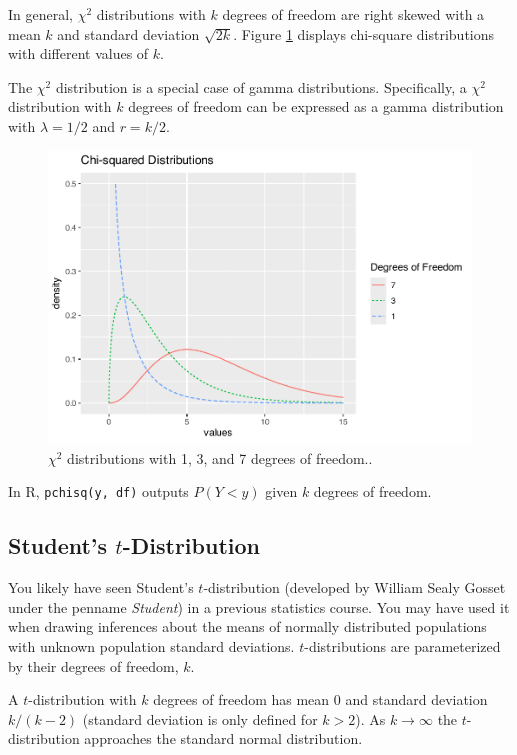 \documentclass[
]{krantz}
\begin{document}
In general, \(\chi^2\) distributions with \(k\) degrees of freedom are right skewed with a mean \(k\) and standard deviation \(\sqrt{2k}\). Figure \ref{fig:multChisq} displays chi-square distributions with different values of \(k\).

The \(\chi^2\) distribution is a special case of gamma distributions. Specifically, a \(\chi^2\) distribution with \(k\) degrees of freedom can be expressed as a gamma distribution with \(\lambda = 1/2\) and \(r = k/2\).



\begin{figure}

{\centering \includegraphics[width=0.6\linewidth]{bookdown-BeyondMLR_files/figure-latex/multChisq-1} 

}

\caption{\(\chi^2\) distributions with 1, 3, and 7 degrees of freedom..}\label{fig:multChisq}
\end{figure}

In R, \texttt{pchisq(y,\ df)} outputs \(P(Y < y)\) given \(k\) degrees of freedom.

\hypertarget{students-t-distribution}{%
\subsection{\texorpdfstring{Student's \(t\)-Distribution}{Student's t-Distribution}}\label{students-t-distribution}}

You likely have seen Student's \(t\)-distribution  (developed by William Sealy Gosset under the penname \emph{Student}) in a previous statistics course. You may have used it when drawing inferences about the means of normally distributed populations with unknown population standard deviations. \(t\)-distributions are parameterized by their degrees of freedom, \(k\).

A \(t\)-distribution with \(k\) degrees of freedom has mean \(0\) and standard deviation \(k/(k-2)\) (standard deviation is only defined for \(k > 2\)). As \(k \rightarrow \infty\) the \(t\)-distribution approaches the standard normal distribution.
\end{document}
